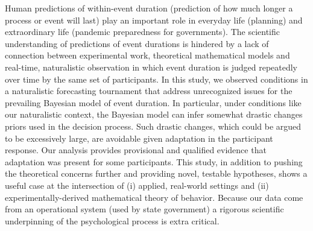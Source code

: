 
Human predictions of within-event duration (prediction of how much longer a process or event will last) play an important role in everyday life (planning) and extraordinary life (pandemic preparedness for governments).  The scientific understanding of predictions of event durations is hindered by a lack of connection between experimental work, theoretical mathematical models and real-time, naturalistic observation in which event duration is judged repeatedly over time by the same set of participants.  In this study, we observed conditions in a naturalistic forecasting tournament that address unrecognized issues for the prevailing Bayesian model of event duration.  In particular, under conditions like our naturalistic context, the Bayesian model can infer somewhat drastic changes priors used in the decision process.  Such drastic changes, which could be argued to be excessively large, are avoidable given adaptation in the participant response.  Our analysis provides provisional and qualified evidence that adaptation was present for some participants.  This study, in addition to pushing the theoretical concerns further and providing novel, testable hypotheses, shows a useful case at the intersection of (i) applied, real-world settings and (ii) experimentally-derived mathematical theory of behavior.  Because our data come from an operational system (used by state government) a rigorous scientific underpinning of the psychological process is extra critical. 

